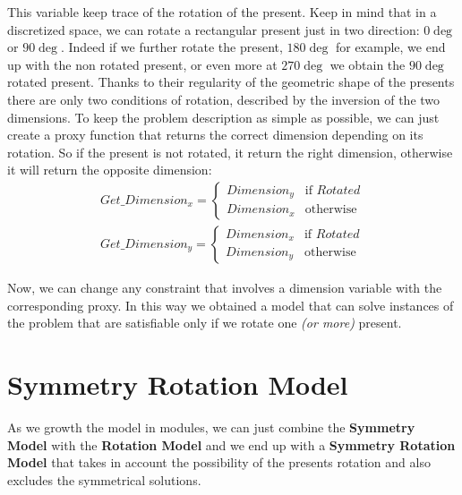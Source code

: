 This variable keep trace of the rotation of the present. Keep in mind that in a discretized space, we can rotate a rectangular present just in two direction: $0\deg$ or $90\deg$.
Indeed if we further rotate the present, $180\deg$ for example, we end up with the non rotated present, or even more at $270\deg$ we obtain the $90\deg$ rotated present.
Thanks to their regularity of the geometric shape of the presents there are only two conditions of rotation, described by the inversion of the two dimensions.
To keep the problem description as simple as possible, we can just create a proxy function that returns the correct dimension depending on its rotation.
So if the present is not rotated, it return the right dimension, otherwise it will return the opposite dimension:\\
\begin{equation*}\begin{split}
    Get\_Dimension_x = 
    \begin{cases}
        Dimension_y & \text{if } Rotated \\
        Dimension_x & \text{otherwise}
    \end{cases} \\
    Get\_Dimension_y = 
    \begin{cases}
        Dimension_x & \text{if } Rotated \\
        Dimension_y & \text{otherwise}
    \end{cases}
\end{split}\end{equation*}

Now, we can change any constraint that involves a dimension variable with the corresponding proxy.
In this way we obtained a model that can solve instances of the problem that are satisfiable only if we rotate one \textit{(or more)} present.



\newpage
\section{Symmetry Rotation Model}
As we growth the model in modules, we can just combine the \textbf{Symmetry Model} with the \textbf{Rotation Model} and we end up
with a \textbf{Symmetry Rotation Model} that takes in account the possibility of the presents rotation and also excludes the symmetrical
solutions.

